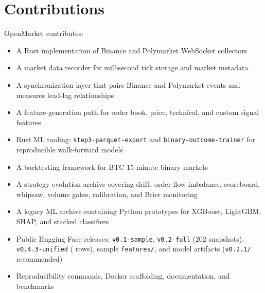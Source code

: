\section{Contributions}
\label{sec:contributions}

OpenMarket contributes:
\begin{itemize}
  \item A Rust implementation of Binance and Polymarket WebSocket collectors
  \item A market data recorder for millisecond tick storage and market metadata
  \item A synchronization layer that pairs Binance and Polymarket events and
        measures lead-lag relationships
  \item A feature-generation path for order book, price, technical, and custom
        signal features
  \item Rust ML tooling: \texttt{step3-parquet-export} and
        \texttt{binary-outcome-trainer} for reproducible walk-forward models
  \item A backtesting framework for BTC 15-minute binary markets
  \item A strategy evolution archive covering drift, order-flow imbalance,
        scoreboard, whipsaw, volume gates, calibration, and Brier monitoring
  \item A legacy ML archive containing Python prototypes for XGBoost, LightGBM,
        SHAP, and stacked classifiers
  \item Public Hugging Face releases: \texttt{v0.1-sample},
        \texttt{v0.2-full} (202 snapshots), \texttt{v0.4.3-unified}
        (\OpenMarketTotalRows{} rows), sample \texttt{features/}, and model
        artifacts (\texttt{v0.2.1/} recommended)
  \item Reproducibility commands, Docker scaffolding, documentation, and
        benchmarks
\end{itemize}